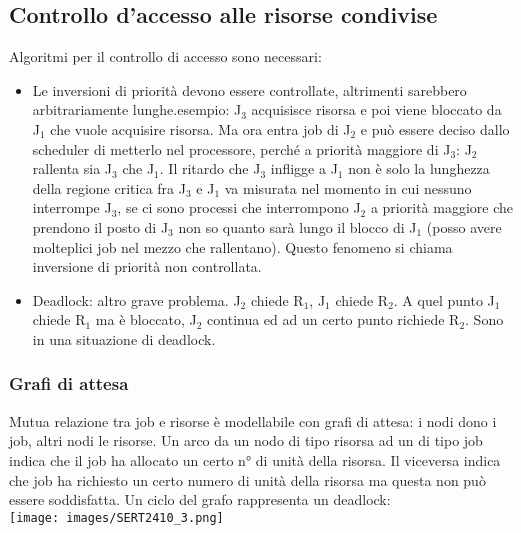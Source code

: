 \documentclass[18px]{article}
\begin{document}
\subsection{Controllo d'accesso alle risorse condivise}
Algoritmi per il controllo di accesso sono necessari:
\begin{itemize}
\item Le inversioni di priorità devono essere controllate, altrimenti sarebbero arbitrariamente lunghe.esempio: J$_{3}$ acquisisce risorsa e poi viene bloccato da J$_{1}$ che vuole acquisire risorsa. Ma ora entra job di J$_{2}$ e può essere deciso dallo scheduler di metterlo nel processore, perché a priorità maggiore di J$_{3}$: J$_{2}$ rallenta sia J$_{3}$ che J$_{1}$. Il ritardo che J$_{3}$ infligge a J$_{1}$ non è solo la lunghezza della regione critica fra J$_{3}$ e J$_{1}$ va misurata nel momento in cui nessuno interrompe J$_{3}$, se ci sono processi che interrompono J$_{2}$ a priorità maggiore che prendono il posto di J$_{3}$ non so quanto sarà lungo il blocco di J$_{1}$ (posso avere molteplici job nel mezzo che rallentano). Questo fenomeno si chiama inversione di priorità non controllata.
\item Deadlock: altro grave problema. J$_{2}$ chiede R$_{1}$, J$_{1}$ chiede R$_{2}$. A quel punto J$_{1}$ chiede R$_{1}$ ma è bloccato, J$_{2}$ continua ed ad un certo punto richiede R$_{2}$. Sono in una situazione di deadlock.
\end{itemize}
\subsubsection{Grafi di attesa}
Mutua relazione tra job e risorse è modellabile con grafi di attesa: i nodi dono i job, altri nodi le risorse. Un arco da un nodo di tipo risorsa ad un di tipo job indica che il job ha allocato un certo n° di unità della risorsa. Il viceversa indica che job ha richiesto un certo numero di unità della risorsa ma questa non può essere soddisfatta. Un ciclo del grafo rappresenta un deadlock:\\
\texttt{[image: images/SERT2410\_3.png]}
\end{document}

